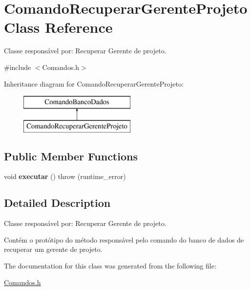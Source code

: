 \hypertarget{class_comando_recuperar_gerente_projeto}{}\section{Comando\+Recuperar\+Gerente\+Projeto Class Reference}
\label{class_comando_recuperar_gerente_projeto}


Classe responsável por\+: Recuperar Gerente de projeto.  




{\ttfamily \#include $<$Comandos.\+h$>$}

Inheritance diagram for Comando\+Recuperar\+Gerente\+Projeto\+:\begin{figure}[H]
\begin{center}
\leavevmode
\includegraphics[height=2.000000cm]{class_comando_recuperar_gerente_projeto}
\end{center}
\end{figure}
\subsection*{Public Member Functions}
\begin{DoxyCompactItemize}
\item 
\hypertarget{class_comando_recuperar_gerente_projeto_a1c3b91e806c82dbfa8e606888a68f57e}{}\label{class_comando_recuperar_gerente_projeto_a1c3b91e806c82dbfa8e606888a68f57e} 
void {\bfseries executar} ()  throw (runtime\+\_\+error)
\end{DoxyCompactItemize}


\subsection{Detailed Description}
Classe responsável por\+: Recuperar Gerente de projeto. 

Contém o protótipo do método responsável pelo comando do banco de dados de recuperar um gerente de projeto. 

The documentation for this class was generated from the following file\+:\begin{DoxyCompactItemize}
\item 
\hyperlink{_comandos_8h}{Comandos.\+h}\end{DoxyCompactItemize}
